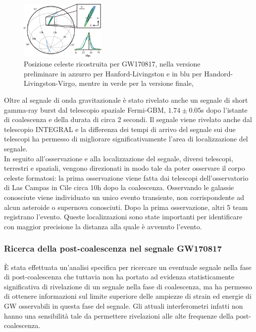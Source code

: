\begin{figure}
	\vspace{-30pt}
	\begin{center}
		\includegraphics[width=0.37\textwidth]{figures/Capitolo_1/skymap.png}
	\end{center}
	\vspace{-6pt}
	\caption{Posizione celeste ricostruita per GW170817, nella versione preliminare in azzurro per Hanford-Livingston e in blu per Handord-Livingston-Virgo, mentre in verde per la versione finale, \cite{Abbott_2019}}
	\label{fig:skymap}
	\vspace{-30pt}
\end{figure}
Oltre al segnale di onda gravitazionale è stato rivelato anche un segnale di short gamma-ray burst dal telescopio spaziale Fermi-GBM, $1.74\pm0.05$s dopo l'istante di coalescenza e della durata di circa 2 secondi. Il segnale viene rivelato anche dal telescopio INTEGRAL e la differenza dei tempi di arrivo del segnale sui due telescopi ha permesso di migliorare significativamente l'area di localizzazione del segnale.\\
In seguito all'osservazione e alla localizzazione del segnale, diversi telescopi, terrestri e spaziali, vengono direzionati in modo tale da poter osservare il corpo celeste formatosi: la prima osservazione viene fatta dai telescopi dell'osservatorio di Las Campas in Cile circa 10h dopo la coalescenza. Osservando le galassie conosciute viene individuato un unico evento transiente, non corrispondente ad alcun asteroide o supernova conosciuti. Dopo la prima osservazione, altri 5 team registrano l'evento. Queste localizzazioni sono state importanti per identificare con maggior precisione la distanza alla quale è avvenuto l'evento\cite{Abbott_2017c}.


\subsubsection{Ricerca della post-coalescenza nel segnale GW170817}
\label{section:postmergerGW170817}
È stata effettuata un'analisi specifica per ricercare un eventuale segnale nella fase di post-coalescenza che tuttavia non ha portato ad evidenza statisticamente significativa di rivelazione di un segnale nella fase di coalescenza, ma ha permesso di ottenere informazioni sul limite superiore delle ampiezze di strain ed energie di GW osservabili in questa fase del segnale. Gli attuali interferometri infatti non hanno una sensibilità tale da permettere rivelazioni alle alte frequenze della post-coalescenza.

